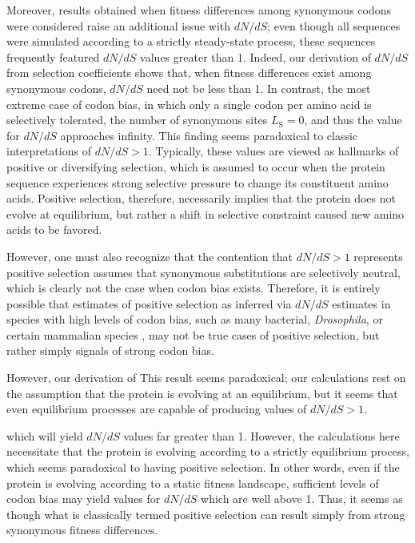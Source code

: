\documentclass[11pt]{article}
\begin{document}
Moreover, results obtained when fitness differences among synonymous codons were considered raise an additional issue with $dN/dS$; even though all sequences were simulated according to a strictly steady-state process, these sequences frequently featured $dN/dS$ values greater than 1. Indeed, our derivation of $dN/dS$ from selection coefficients shows that, when fitness differences exist among synonymous codons, $dN/dS$ need not be less than 1. In contrast, the most extreme case of codon bias, in which only a single codon per amino acid is selectively tolerated, the number of synonymous sites $L_\text{S} = 0$, and thus the value for $dN/dS$ approaches infinity. This finding seems paradoxical to classic interpretations of $dN/dS >1$. Typically, these values are viewed as hallmarks of positive or diversifying selection, which is assumed to occur when the protein sequence experiences strong selective pressure to change its constituent amino acids. Positive selection, therefore, necessarily implies that the protein does not evolve at equilibrium, but rather a shift in selective constraint caused new amino acids to be favored. 

However, one must also recognize that the contention that $dN/dS > 1$ represents positive selection assumes that synonymous substitutions are selectively neutral, which is clearly not the case when codon bias exists. Therefore, it is entirely possible that estimates of positive selection as inferred via $dN/dS$ estimates in species with high levels of codon bias, such as many bacterial, \textit{Drosophila}, or certain mammalian species \cite{Duret2002, Chamaryetal2006, HershbergPetrov2008, PlotkinKudla2010}, may not be true cases of positive selection, but rather simply signals of strong codon bias.


However, our derivation of 
This result seems paradoxical; our calculations rest on the assumption that the protein is evolving at an equilibrium, but it seems that even equilibrium processes are capable of producing values of $dN/dS > 1$. 



 which will yield $dN/dS$ values far greater than 1. However, the calculations here necessitate that the protein is evolving according to a strictly equilibrium process, which seems paradoxical to having positive selection. In other words, even if the protein is evolving according to a static fitness landscape, sufficient levels of codon bias may yield values for $dN/dS$ which are well above 1. Thus, it seems as though what is classically termed positive selection can result simply from strong synonymous fitness differences.
 
\end{document}
